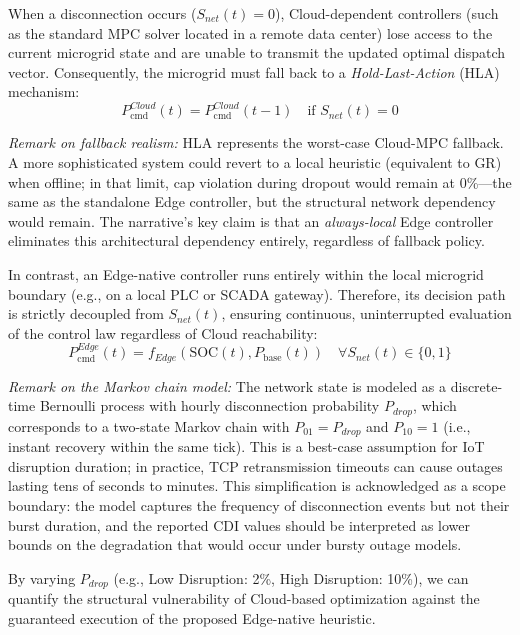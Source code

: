 \documentclass[preprint,12pt]{elsarticle}
\newcommand{\SOC}{\mathrm{SOC}}
\newcommand{\Pcmd}{P_{\mathrm{cmd}}}
\newcommand{\Pbase}{P_{\mathrm{base}}}
\begin{document}
When a disconnection occurs ($S_{net}(t) = 0$), Cloud-dependent controllers (such as the standard MPC solver located in a remote data center) lose access to the current microgrid state and are unable to transmit the updated optimal dispatch vector. Consequently, the microgrid must fall back to a \textit{Hold-Last-Action} (HLA) mechanism:
\begin{equation}
\Pcmd^{Cloud}(t) = \Pcmd^{Cloud}(t-1) \quad \text{if } S_{net}(t) = 0
\end{equation}

\textit{Remark on fallback realism:} HLA represents the worst-case Cloud-MPC fallback. A more sophisticated system could revert to a local heuristic (equivalent to GR) when offline; in that limit, cap violation during dropout would remain at 0\%---the same as the standalone Edge controller, but the structural network dependency would remain. The narrative's key claim is that an \emph{always-local} Edge controller eliminates this architectural dependency entirely, regardless of fallback policy.

In contrast, an Edge-native controller runs entirely within the local microgrid boundary (e.g., on a local PLC or SCADA gateway). Therefore, its decision path is strictly decoupled from $S_{net}(t)$, ensuring continuous, uninterrupted evaluation of the control law regardless of Cloud reachability:
\begin{equation}
\Pcmd^{Edge}(t) = f_{Edge}(\SOC(t), \Pbase(t)) \quad \forall S_{net}(t) \in \{0, 1\}
\end{equation}

\textit{Remark on the Markov chain model:} The network state is modeled as a discrete-time Bernoulli process with hourly disconnection probability $P_{drop}$, which corresponds to a two-state Markov chain with $P_{01}=P_{drop}$ and $P_{10}=1$ (i.e., instant recovery within the same tick). This is a best-case assumption for IoT disruption duration; in practice, TCP retransmission timeouts can cause outages lasting tens of seconds to minutes. This simplification is acknowledged as a scope boundary: the model captures the frequency of disconnection events but not their burst duration, and the reported CDI values should be interpreted as lower bounds on the degradation that would occur under bursty outage models.

By varying $P_{drop}$ (e.g., Low Disruption: 2\%, High Disruption: 10\%), we can quantify the structural vulnerability of Cloud-based optimization against the guaranteed execution of the proposed Edge-native heuristic.
\end{document}
